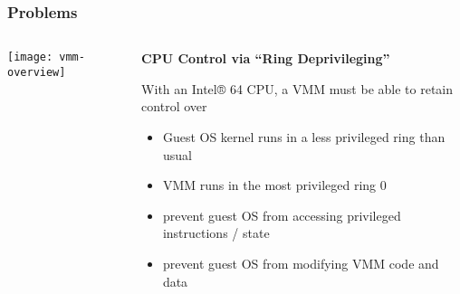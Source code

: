 \begin{frame}[plain]
	\frametitle{Problems }
	
	
	
	\begin{columns}
		
		\begin{column}{.3\textwidth}
			
			\texttt{[image: vmm-overview]}
			
		\end{column}
		
		\begin{column}{.7\textwidth}
			
			\textbf{CPU Control via “Ring Deprivileging”}
			
			With an Intel® 64 CPU, a VMM must be able to retain control over
			\begin{itemize}
				\item Guest OS kernel runs in a less privileged ring than usual
				
				\item VMM runs in the most privileged ring 0
				\item prevent guest OS from accessing privileged instructions / state
				\item prevent guest OS from modifying VMM code and data

			\end{itemize} 
			
		\end{column}
		
		
	\end{columns}
	
	
\end{frame}


